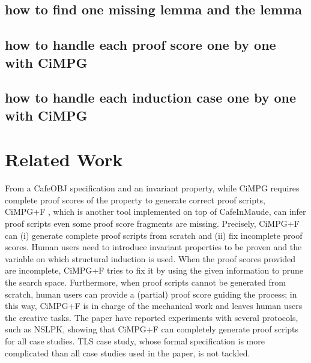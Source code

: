 \documentclass[a4paper,fleqn]{cas-dc}
\begin{document}
\subsection{how to find one missing lemma and the lemma}
\subsection{how to handle each proof score one by one with CiMPG}
\subsection{how to handle each induction case one by one with CiMPG}


\section{Related Work}\label{relatedwork}
From a CafeOBJ specification and an invariant property,
while CiMPG requires complete proof scores of the property to generate correct proof scripts,
CiMPG+F \cite{Riesco20}, which is another tool implemented on top of CafeInMaude,
can infer proof scripts even some proof score fragments are missing.
Precisely, CiMPG+F can (i) generate complete proof scripts from scratch and (ii) fix incomplete proof scores.
Human users need to introduce invariant properties to be proven and the variable on which structural induction is used.
When the proof scores provided are incomplete, CiMPG+F tries to fix it by using the given information to prune the search space.
Furthermore, when proof scripts cannot be generated from scratch, human users can provide a (partial) proof score guiding the process; in this way, CiMPG+F is in charge of the mechanical work and leaves human users the creative tasks.
The paper \cite{Riesco20} have reported experiments with several protocols, such as NSLPK, showing that CiMPG+F can completely generate proof scripts for all case studies.
TLS case study, whose formal specification is more complicated than all case studies used in the paper, is not tackled.

\end{document}
